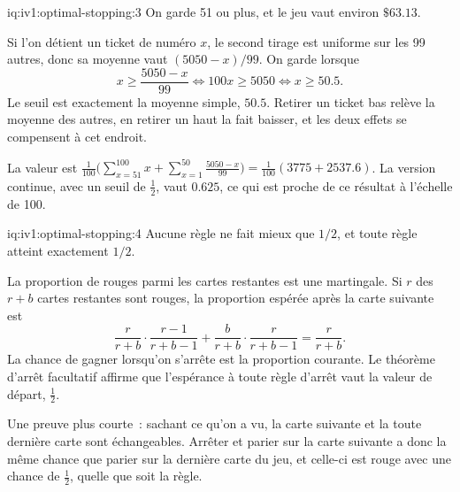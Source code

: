 \enlargethispage{-3\baselineskip}%
\begin{solution}{iq:iv1:optimal-stopping:3}
On garde 51 ou plus, et le jeu vaut environ $\$63.13$.

Si l'on détient un ticket de numéro $x$, le second tirage est uniforme sur les 99 autres, donc sa moyenne vaut $(5050 - x)/99$. On garde lorsque
\[
x \ge \frac{5050 - x}{99} \iff 100x \ge 5050 \iff x \ge 50.5.
\]
Le seuil est exactement la moyenne simple, $50.5$. Retirer un ticket bas relève la moyenne des autres, en retirer un haut la fait baisser, et les deux effets se compensent à cet endroit.

La valeur est $\frac{1}{100}\bigl(\sum_{x = 51}^{100} x + \sum_{x = 1}^{50} \frac{5050 - x}{99}\bigr) = \frac{1}{100}(3775 + 2537.6)$. La version continue, avec un seuil de $\tfrac12$, vaut $0.625$, ce qui est proche de ce résultat à l'échelle de 100.

\end{solution}

\begin{solution}{iq:iv1:optimal-stopping:4}
Aucune règle ne fait mieux que $1/2$, et toute règle atteint exactement $1/2$.

La proportion de rouges parmi les cartes restantes est une martingale. Si $r$ des $r + b$ cartes restantes sont rouges, la proportion espérée après la carte suivante est
\[
\frac{r}{r + b} \cdot \frac{r - 1}{r + b - 1} + \frac{b}{r + b} \cdot \frac{r}{r + b - 1} = \frac{r}{r + b}.
\]
La chance de gagner lorsqu'on s'arrête est la proportion courante. Le théorème d'arrêt facultatif affirme que l'espérance à toute règle d'arrêt vaut la valeur de départ, $\tfrac12$.

Une preuve plus courte~: sachant ce qu'on a vu, la carte suivante et la toute dernière carte sont échangeables. Arrêter et parier sur la carte suivante a donc la même chance que parier sur la dernière carte du jeu, et celle-ci est rouge avec une chance de $\tfrac12$, quelle que soit la règle.

\end{solution}

